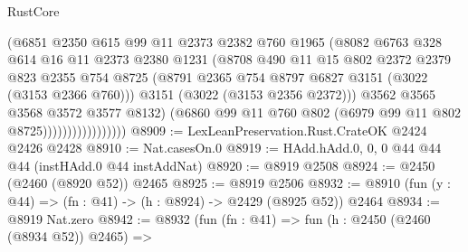 \begin{lexlean}{RustCore}
\begin{coremodule}
                                (@6851
                                  @2350
                                  @615
                                  @99
                                  @11
                                  @2373
                                  @2382
                                  @760
                                  @1965
                                  (@8082
                                    @6763
                                    @328
                                    @614
                                    @16
                                    @11
                                    @2373
                                    @2380
                                    @1231
                                    (@8708
                                      @490
                                      @11
                                      @15
                                      @802
                                      @2372
                                      @2379
                                      @823
                                      @2355
                                      @754
                                      @8725
                                      (@8791
                                        @2365
                                        @754
                                        @8797
                                        @6827
                                        @3151
                                        (@3022 (@3153 @2366 @760)))
                                      @3151
                                      (@3022 (@3153 @2356 @2372)))
                                    @3562
                                    @3565
                                    @3568
                                    @3572
                                    @3577
                                    @8132)
                                  (@6860
                                    @99
                                    @11
                                    @760
                                    @802
                                    (@6979 @99 @11 @802 @8725)))))))))))))))))
@8909 := LexLeanPreservation.Rust.CrateOK @2424 @2426 @2428
@8910 := Nat.casesOn.{0}
@8919 := HAdd.hAdd.{0, 0, 0} @44 @44 @44 (instHAdd.{0} @44 instAddNat)
@8920 := @8919 @2508
@8924 := @2450 (@2460 (@8920 @52)) @2465
@8925 := @8919 @2506
@8932 := @8910 (fun (y : @44) => (fn : @41) -> (h : @8924) -> @2429 (@8925 @52)) @2464
@8934 := @8919 Nat.zero
@8942 := @8932
    (fun (fn : @41) =>
    fun (h : @2450 (@2460 (@8934 @52)) @2465) =>

\end{coremodule}
\end{lexlean}

